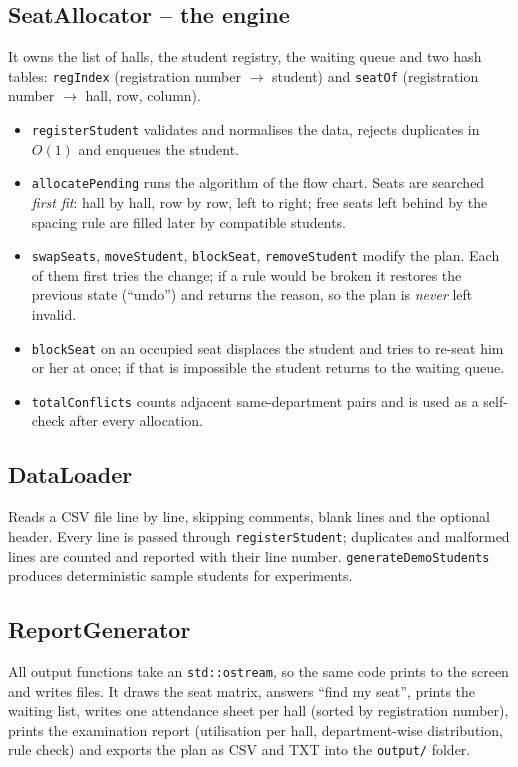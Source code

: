 \documentclass[12pt,a4paper]{report}
\begin{document}
\subsection{SeatAllocator -- the engine}
It owns the list of halls, the student registry, the waiting queue and two hash tables: \texttt{regIndex} (registration number $\rightarrow$ student) and \texttt{seatOf} (registration number $\rightarrow$ hall, row, column).
\begin{itemize}
  \item \texttt{registerStudent} validates and normalises the data, rejects duplicates in $O(1)$ and enqueues the student.
  \item \texttt{allocatePending} runs the algorithm of the flow chart. Seats are searched \emph{first fit}: hall by hall, row by row, left to right; free seats left behind by the spacing rule are filled later by compatible students.
  \item \texttt{swapSeats}, \texttt{moveStudent}, \texttt{blockSeat}, \texttt{removeStudent} modify the plan. Each of them first tries the change; if a rule would be broken it restores the previous state (``undo'') and returns the reason, so the plan is \emph{never} left invalid.
  \item \texttt{blockSeat} on an occupied seat displaces the student and tries to re-seat him or her at once; if that is impossible the student returns to the waiting queue.
  \item \texttt{totalConflicts} counts adjacent same-department pairs and is used as a self-check after every allocation.
\end{itemize}

\subsection{DataLoader}
Reads a CSV file line by line, skipping comments, blank lines and the optional header. Every line is passed through \texttt{registerStudent}; duplicates and malformed lines are counted and reported with their line number. \texttt{generateDemoStudents} produces deterministic sample students for experiments.

\subsection{ReportGenerator}
All output functions take an \texttt{std::ostream}, so the same code prints to the screen and writes files. It draws the seat matrix, answers ``find my seat'', prints the waiting list, writes one attendance sheet per hall (sorted by registration number), prints the examination report (utilisation per hall, department-wise distribution, rule check) and exports the plan as CSV and TXT into the \texttt{output/} folder.
\end{document}
